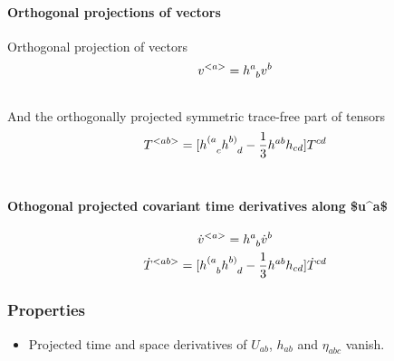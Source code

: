 \documentclass[letterpaper,10pt,english]{sphinxmanual}
\begin{document}
{\paragraph{Orthogonal projections of vectors}
\label{GeneralRelativity:orthogonal-projections-of-vectors}
Orthogonal projection of vectors
\begin{gather}
\begin{split}\begin{equation}
v^{<a>}      = h^a_{\phantom a b} v^b
\end{equation}\end{split}\notag\\\begin{split}\end{split}\notag
\end{gather}
And the orthogonally projected symmetric trace-free part of tensors
\begin{gather}
\begin{split}\begin{equation}
     T^{<ab>} = [h^{(a}_{\phantom {(a} c} h^{b)}_{\phantom{b)}d} - \frac{1}{3} h^{ab} h_{cd} ] T^{cd}
\end{equation}\end{split}\notag\\\begin{split}\end{split}\notag
\end{gather}

\paragraph{Othogonal projected covariant time derivatives along \$u\textasciicircum{}a\$}
\label{GeneralRelativity:othogonal-projected-covariant-time-derivatives-along-u-a}\begin{gather}
\begin{split}\dot v^{<a>} = h^a_{\phantom a b} \dot v^b\end{split}\notag\\\begin{split}\dot T^{<ab>} = [ h^{(a}_{\phantom{(a}b} h^{b)}_{\phantom{b)} d} - \frac 1 3 h^{ab}h_{cd} ]\dot T^{cd}\end{split}\notag
\end{gather}

\subsubsection{Properties}
\label{GeneralRelativity:properties}\begin{itemize}
\item {} 
Projected time and space derivatives of $U_{ab}$, $h_{ab}$ and $\eta_{abc}$ vanish.


\end{itemize}}
\end{document}
